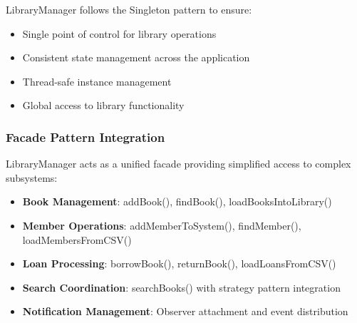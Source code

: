 LibraryManager follows the Singleton pattern to ensure:
\begin{itemize}
	\item Single point of control for library operations
	\item Consistent state management across the application
	\item Thread-safe instance management
	\item Global access to library functionality
\end{itemize}


\subsubsection{Facade Pattern Integration}

LibraryManager acts as a unified facade providing simplified access to complex subsystems:

\begin{itemize}
	\item \textbf{Book Management}: addBook(), findBook(), loadBooksIntoLibrary()
	\item \textbf{Member Operations}: addMemberToSystem(), findMember(), loadMembersFromCSV()
	\item \textbf{Loan Processing}: borrowBook(), returnBook(), loadLoansFromCSV()
	\item \textbf{Search Coordination}: searchBooks() with strategy pattern integration
	\item \textbf{Notification Management}: Observer attachment and event distribution
\end{itemize}


